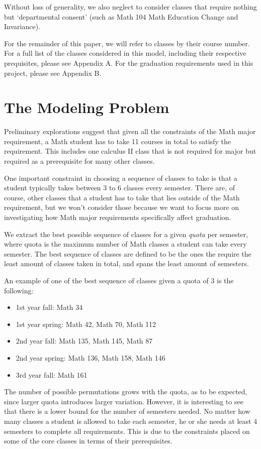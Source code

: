 \documentclass[11pt, oneside]{article}
\begin{document}
Without loss of generality, we also neglect to consider classes that require nothing but `departmental consent' (such as Math 104 Math Education Change and Invariance). 

For the remainder of this paper, we will refer to classes by their course number. For a full list of the classes considered in this model, including their respective prequisites, please see Appendix A. For the graduation requirements used in this project, please see Appendix B.


\section{The Modeling Problem}
Preliminary explorations suggest that given all the constraints of the Math major requirement, a Math student has to take 11 courses in total to satisfy the requirement. This includes one calculus II class that is not required for major but required as a prerequisite for many other classes.

One important constraint in choosing a sequence of classes to take is that a student typically takes between 3 to 6 classes every semester. There are, of course, other classes that a student has to take that lies outside of the Math requirement, but we won't consider those because we want to focus more on investigating how Math major requirements specifically affect graduation.

We extract the best possible sequence of classes for a given \textit{quota} per semester, where quota is the maximum number of Math classes a student can take every semester. The best sequence of classes are defined to be the ones the require the least amount of classes taken in total, and spans the least amount of semesters. 

An example of one of the best sequence of classes given a quota of 3 is the following:
    \begin{itemize}
    \item 1st year fall: Math 34
    \item 1st year spring: Math 42, Math 70, Math 112
    \item 2nd year fall: Math 135, Math 145, Math 87
    \item 2nd year spring: Math 136, Math 158, Math 146
    \item 3rd year fall: Math 161
    \end{itemize}

The number of possible permutations grows with the quota, as to be expected, since larger quota introduces larger variation. However, it is interesting to see that there is a lower bound for the number of semesters needed. No matter how many classes a student is allowed to take each semester, he or she needs at least 4 semesters to complete all requirements. This is due to the constraints placed on some of the core classes in terms of their prerequisites.
\end{document}
